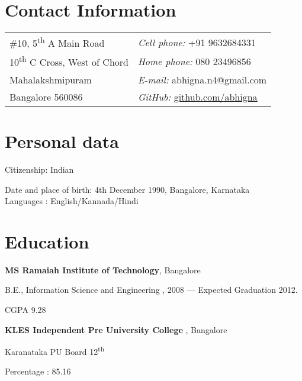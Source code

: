 \begin{resume}
\section{\sc Contact Information}
\vspace{.05in}
\begin{tabular}{@{}p{4in}p{4in}}
\#10, 5\textsuperscript{th} A Main Road    & {\it Cell phone:} +91 9632684331 \\
10\textsuperscript{th}  C Cross, West of Chord  & {\it Home phone:} 080 23496856   \\
Mahalakshmipuram & {\it E-mail:} abhigna.n4@gmail.com
\\
   Bangalore 560086 & {\it GitHub:} \href{https://github.com/abhigna}{\underline{github.com/abhigna }}
 \\
\end{tabular}

\section{\sc Personal \qquad data} Citizenship: Indian

\vspace*{-3.5mm}
Date and place of birth: 4th December 1990, Bangalore, Karnataka\\
\vspace*{-3.5mm}Languages : English/Kannada/Hindi \\

\vspace*{1.5mm}

\section{\sc Education}

{\bf \textsf{MS Ramaiah Institute of Technology}}, Bangalore\\
\vspace*{-.1in}
\begin{list1}
\item[] B.E., Information Science and Engineering ,  2008 ---
Expected Graduation 2012. \qquad
\begin{list2}
\item  CGPA 9.28
\end{list2}
\end{list1}

{\bf \textsf{KLES Independent Pre University College }}, Bangalore\\
\vspace*{-.1in}
\begin{list1}
\item[] Karanataka PU Board 12\textsuperscript{th}  \qquad
\begin{list2}
\item  Percentage : 85.16
\end{list2}
\end{list1}



\end{resume}
